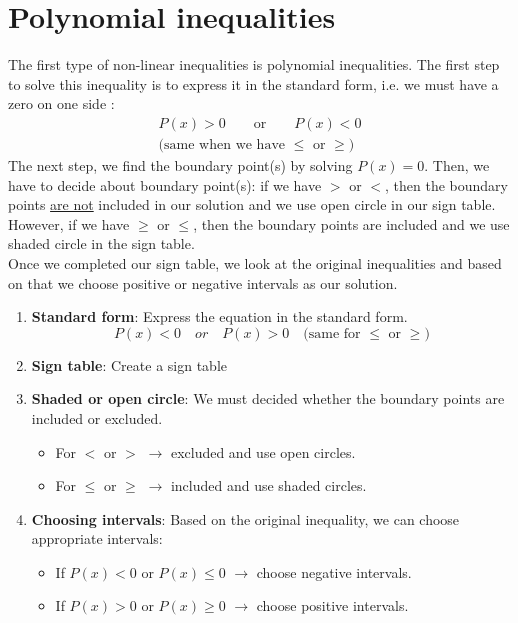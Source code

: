 \section{Polynomial inequalities}
The first type of non-linear inequalities is polynomial inequalities. The first step to solve this inequality is to express it in the standard form, i.e. we must have a zero on one side :
\begin{align*}
            P(x) > 0 \qquad \text{or} \qquad P(x) < 0 \\
            \text{(same when we have $\le$ or $\ge$)}
\end{align*}
The next step, we find the boundary point(s) by solving $P(x)=0$. Then, we have to decide about boundary point(s): if we have $>$ or $<$, then the boundary points \underline{are not} included in our solution and we use open circle in our sign table. However, if we have $\ge$ or $\le$, then the boundary points are included and we use shaded circle in the sign table.\\
Once we completed our sign table, we look at the original inequalities and based on that we choose positive or negative intervals as our solution.
\begin{tcolorbox}[title=Solving a polynomial inequality,
                  fonttitle=\bfseries,
                  colframe=blue!75!black,
                  colback=blue!5!white]
    \begin{enumerate}[1.]
        \item \textbf{Standard form}: Express the equation in the standard form.
        \[
            P(x) <0 \quad or \quad P(x)>0 \quad  \text{(same for $\le$ or $\ge$)}
        \]
        \item \textbf{Sign table}: Create a sign table
        \item \textbf{Shaded or open circle}: We must decided whether the boundary points are included or excluded.
            \begin{itemize}
                \item For $<$ or $>$ $\longrightarrow$ excluded and use open circles.
                \item For $\le$ or $\ge$ $\longrightarrow$ included and use shaded circles.
            \end{itemize}
        \item \textbf{Choosing intervals}: Based on the original inequality, we can choose appropriate intervals:
            \begin{itemize}
                \item If $P(x)<0$ or $P(x) \le 0$ $\longrightarrow$ choose negative intervals.
                \item If $P(x)>0$ or $P(x) \ge 0$ $\longrightarrow$ choose positive intervals.
            \end{itemize}
    \end{enumerate}
\end{tcolorbox}
